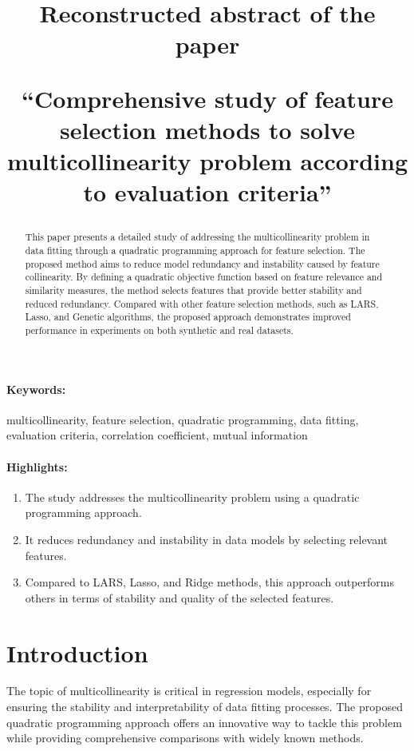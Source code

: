 \documentclass[12pt]{article}
\title{Reconstructed abstract of the paper 

``Comprehensive study of feature selection methods to solve multicollinearity problem according to evaluation criteria''}
\date{}
\begin{document}
\maketitle

\begin{abstract}
This paper presents a detailed study of addressing the multicollinearity problem in data fitting through a quadratic programming approach for feature selection. The proposed method aims to reduce model redundancy and instability caused by feature collinearity. By defining a quadratic objective function based on feature relevance and similarity measures, the method selects features that provide better stability and reduced redundancy. Compared with other feature selection methods, such as LARS, Lasso, and Genetic algorithms, the proposed approach demonstrates improved performance in experiments on both synthetic and real datasets.
\end{abstract}

\paragraph{Keywords:} multicollinearity, feature selection, quadratic programming, data fitting, evaluation criteria, correlation coefficient, mutual information

\paragraph{Highlights:}
\begin{enumerate}
    \item The study addresses the multicollinearity problem using a quadratic programming approach.
    \item It reduces redundancy and instability in data models by selecting relevant features.
    \item Compared to LARS, Lasso, and Ridge methods, this approach outperforms others in terms of stability and quality of the selected features.
\end{enumerate}

\section{Introduction}
The topic of multicollinearity is critical in regression models, especially for ensuring the stability and interpretability of data fitting processes. The proposed quadratic programming approach offers an innovative way to tackle this problem while providing comprehensive comparisons with widely known methods.
\end{document}
